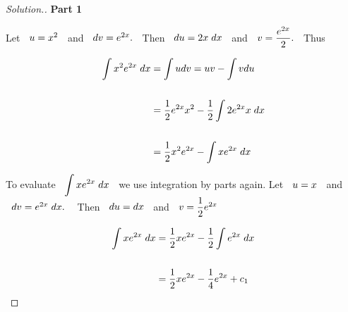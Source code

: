\documentclass[11pt,a4paper]{article}
\theoremstyle{definition}
\newenvironment{solution}
  {\renewcommand{\qedsymbol}{}\begin{proof}[\textit{Solution}.]}
  {\end{proof}}
\newcommand{\subhead}[1]{%
  \par\medskip\noindent\textbf{#1}\par\nobreak\smallskip}
\begin{document}
\begin{solution}
\subhead{Part 1}
Let $\hspace{0.2cm} u = x^2\hspace{0.2cm}$ and $\hspace{0.2cm} dv = e^{2x}.\hspace{0.2cm}$ Then $\hspace{0.2cm} du = 2x \hspace{0.1cm}dx\hspace{0.2cm}$ and $\hspace{0.2cm} v = \dfrac{e^{2x}}{2}.\hspace{0.2cm}$ Thus 

\begin{align*}
\int x^2e^{2x}\hspace{0.1cm}dx & = \int u dv = uv - \int v du\\\\
& = \frac{1}{2}e^{2x}x^2 - \dfrac{1}{2}\int 2 e^{2x}x\hspace{0.1cm}dx\\\\
& = \dfrac{1}{2}x^2e^{2x} - \int x e^{2x}\hspace{0.1cm}dx
\end{align*}

To evaluate $\hspace{0.2cm}\displaystyle{\int x e^{2x}\hspace{0.1cm}dx\hspace{0.2cm}}$ we use integration by parts again.
Let $\hspace{0.2cm} u = x\hspace{0.2cm}$ and $\hspace{0.2cm} dv = e^{2x}\hspace{0.1cm}dx.\hspace{0.3cm}$ Then $\hspace{0.2cm} du = dx\hspace{0.2cm}$ and $\hspace{0.2cm} v = \dfrac{1}{2}e^{2x}$

\begin{align*}
\int x e^{2x}\hspace{0.1cm}dx & = \dfrac{1}{2}xe^{2x} - \dfrac{1}{2}\int e^{2x}\hspace{0.1cm}dx\\\\
& = \dfrac{1}{2}x e^{2x} - \dfrac{1}{4}e^{2x} + c_1\\
\end{align*}


\end{solution}
\end{document}
